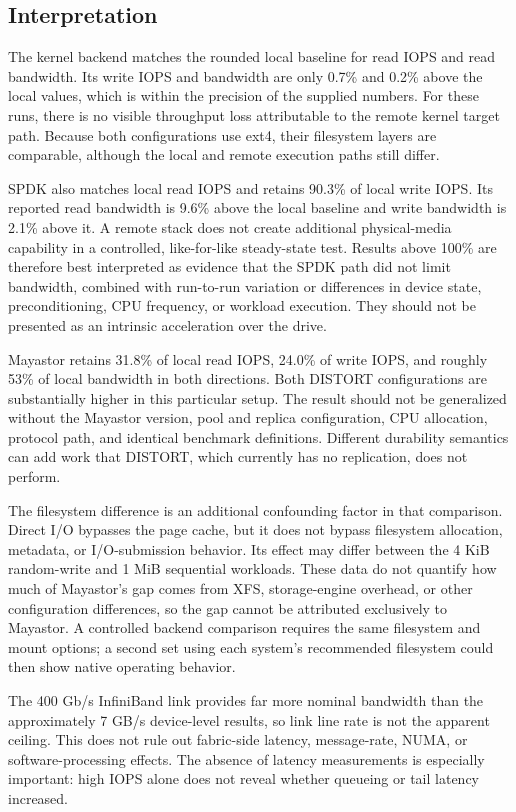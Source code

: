 \documentclass[10pt,a4paper,twocolumn]{article}
\newcommand{\distort}{DISTORT}
\begin{document}
\subsection{Interpretation}

The kernel backend matches the rounded local baseline for read IOPS and
read bandwidth. Its write IOPS and bandwidth are only 0.7\% and 0.2\% above
the local values, which is within the precision of the supplied numbers. For
these runs, there is no visible throughput loss attributable to the remote
kernel target path. Because both configurations use ext4, their filesystem
layers are comparable, although the local and remote execution paths still
differ.

SPDK also matches local read IOPS and retains 90.3\% of local write IOPS. Its
reported read bandwidth is 9.6\% above the local baseline and write bandwidth is
2.1\% above it. A remote stack does not create additional physical-media
capability in a controlled, like-for-like steady-state test. Results above
100\% are therefore best interpreted as evidence that the SPDK path did not
limit bandwidth, combined with run-to-run variation or differences in device
state, preconditioning, CPU frequency, or workload execution. They should not
be presented as an intrinsic acceleration over the drive.

Mayastor retains 31.8\% of local read IOPS, 24.0\% of write IOPS, and roughly
53\% of local bandwidth in both directions. Both \distort{} configurations are
substantially higher in this particular setup. The result should not be
generalized without the Mayastor version, pool and replica configuration, CPU
allocation, protocol path, and identical benchmark definitions. Different
durability semantics can add work that \distort{}, which currently has no
replication, does not perform.

The filesystem difference is an additional confounding factor in that
comparison. Direct I/O bypasses the page cache, but it does not bypass
filesystem allocation, metadata, or I/O-submission behavior. Its effect may
differ between the 4 KiB random-write and 1 MiB sequential workloads. These
data do not quantify how much of Mayastor's gap comes from XFS, storage-engine
overhead, or other configuration differences, so the gap cannot be attributed
exclusively to Mayastor. A controlled backend comparison requires the same
filesystem and mount options; a second set using each system's recommended
filesystem could then show native operating behavior.

The 400 Gb/s InfiniBand link provides far more nominal bandwidth than the
approximately 7 GB/s device-level results, so link line rate is not the
apparent ceiling. This does not rule out fabric-side latency, message-rate,
NUMA, or software-processing effects. The absence of latency measurements is
especially important: high IOPS alone does not reveal whether queueing or tail
latency increased.
\end{document}
